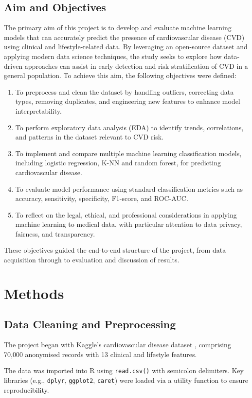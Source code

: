 \documentclass[conference]{IEEEtran}
\begin{document}
\subsection{Aim and Objectives}
The primary aim of this project is to develop and evaluate machine learning models that can accurately predict the presence of cardiovascular disease (CVD) using clinical and lifestyle-related data. By leveraging an open-source dataset and applying modern data science techniques, the study seeks to explore how data-driven approaches can assist in early detection and risk stratification of CVD in a general population. 
To achieve this aim, the following objectives were defined:
\begin{enumerate}
    \item To preprocess and clean the dataset by handling outliers, correcting data types, removing duplicates, and engineering new features to enhance model interpretability.
    \item To perform exploratory data analysis (EDA) to identify trends, correlations, and patterns in the dataset relevant to CVD risk.
    \item To implement and compare multiple machine learning classification models, including logistic regression, K-NN and random forest, for predicting cardiovascular disease. 
    \item To evaluate model performance using standard classification metrics such as accuracy, sensitivity, specificity, F1-score, and ROC-AUC.
    \item To reflect on the legal, ethical, and professional considerations in applying machine learning to medical data, with particular attention to data privacy, fairness, and transparency. 
\end{enumerate}
These objectives guided the end-to-end structure of the project, from data acquisition through to evaluation and discussion of results. 

\section{Methods}
\subsection{Data Cleaning and Preprocessing}
The project began with Kaggle’s cardiovascular disease dataset \cite{DATA}, comprising 70,000 anonymised records with 13 clinical and lifestyle features.

The data was imported into R using \texttt{read.csv()} with semicolon delimiters. Key libraries (e.g., \texttt{dplyr}, \texttt{ggplot2}, \texttt{caret}) were loaded via a utility function to ensure reproducibility.
\end{document}

